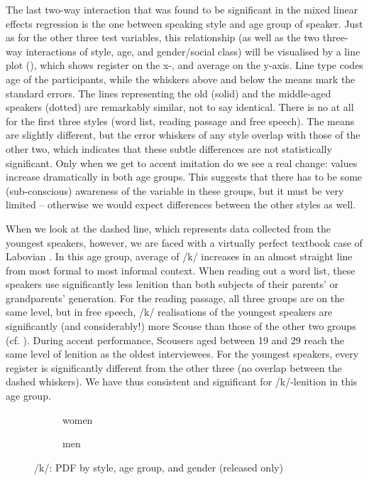 The last two-way interaction that was found to be significant in the mixed linear effects regression is the one between speaking style and age group of speaker.
Just as for the other three test variables, this relationship (as well as the two three-way interactions of style, age, and gender/social class) will be visualised by a line plot (), which shows register on the x-, and average  on the y-axis.
Line type codes age of the participants, while the whiskers above and below the means mark the standard errors.
The lines representing the old (solid) and the middle-aged speakers (dotted) are remarkably similar, not to say identical.
There is no  at all for the first three styles (word list, reading passage and free speech).
The means are slightly different, but the error whiskers of any style overlap with those of the other two, which indicates that these subtle differences are not statistically significant.
Only when we get to accent imitation do we see a real change:  values increase dramatically in both age groups.
This suggests that there has to be some (sub-conscious) awareness of the variable in these groups, but it must be very limited -- otherwise we would expect differences between the other styles as well.

When we look at the dashed line, which represents data collected from the youngest speakers, however, we are faced with a virtually perfect textbook case of Labovian .
In this age group, average  of /k/ increases in an almost straight line from most formal to most informal context.
When reading out a word list, these speakers use significantly less lenition than both subjects of their parents' or grandparents' generation.
For the reading passage, all three groups are on the same level, but in free speech, /k/ realisations of the youngest speakers are significantly (and considerably!) more Scouse than those of the other two groups (cf. ).
During accent performance, Scousers aged between 19 and 29 reach the same level of lenition as the oldest interviewees.
For the youngest speakers, every register is significantly different from the other three (no overlap between the dashed whiskers).
We have thus consistent and significant  for /k/-lenition in this age group.

\begin{figure}[h]
	\centering
	\begin{subfigure}{.49\textwidth}
		\centering
			\resizebox{\linewidth}{!}{} 
		\caption{women}
		\label{fig.line.k.fem}
	\end{subfigure}
	\begin{subfigure}{.49\textwidth}
		\centering
			\resizebox{\linewidth}{!}{} 
		\caption{men}
		\label{fig.line.k.mal}
	\end{subfigure}
	\caption{/k/: PDF by style, age group, and gender (released only)}
\end{figure}

